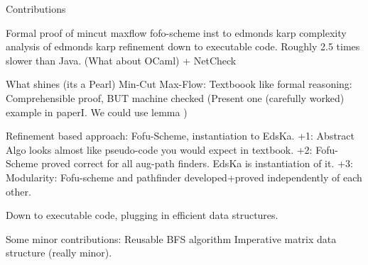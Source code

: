 \documentclass{llncs}
\begin{document}
  
Contributions

  Formal proof of mincut maxflow
  fofo-scheme
  inst to edmonds karp
  complexity analysis of edmonds karp
  refinement down to executable code. Roughly 2.5 times slower than Java. (What about OCaml)
    + NetCheck
    
What shines (its a Pearl)
  Min-Cut Max-Flow: Textboook like formal reasoning: Comprehensible proof, BUT machine checked
    (Present one (carefully worked) example in paperI. We could use lemma )
    
  Refinement based approach: Fofu-Scheme, instantiation to EdsKa. 
    +1: Abstract Algo looks almost like pseudo-code you would expect in textbook.
    +2: Fofu-Scheme proved correct for all aug-path finders. EdsKa is instantiation of it.
    +3: Modularity: Fofu-scheme and pathfinder developed+proved independently of each other.
  
  Down to executable code, plugging in efficient data structures.
  
Some minor contributions:
  Reusable BFS algorithm
  Imperative matrix data structure (really minor).
  
  
  
    









\end{document}
